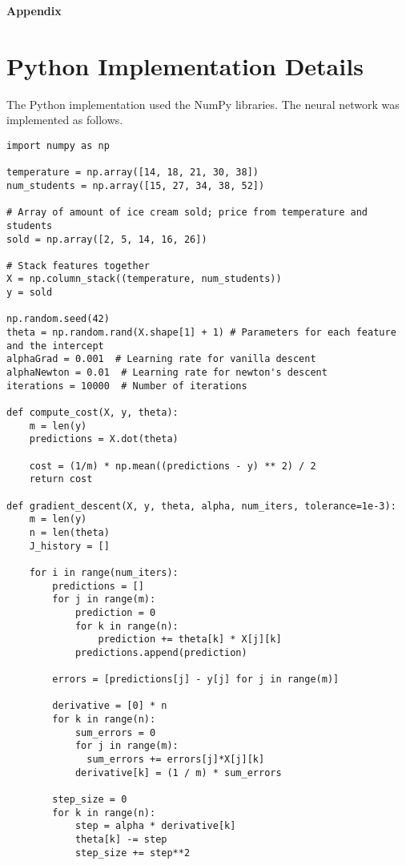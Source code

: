 \documentclass[12pt]{article}
\theoremstyle{definition}
\begin{document}
\newpage
\appendix

\begin{center}
    {\Huge \textbf{Appendix}}
\end{center}

\section{Python Implementation Details}
\label{sec:appendixA}
The Python implementation used the NumPy libraries. The neural network was implemented as follows.

\begin{lstlisting}
import numpy as np

temperature = np.array([14, 18, 21, 30, 38])
num_students = np.array([15, 27, 34, 38, 52])

# Array of amount of ice cream sold; price from temperature and students
sold = np.array([2, 5, 14, 16, 26])

# Stack features together
X = np.column_stack((temperature, num_students))
y = sold

np.random.seed(42)
theta = np.random.rand(X.shape[1] + 1) # Parameters for each feature and the intercept
alphaGrad = 0.001  # Learning rate for vanilla descent
alphaNewton = 0.01  # Learning rate for newton's descent
iterations = 10000  # Number of iterations

def compute_cost(X, y, theta):
    m = len(y)
    predictions = X.dot(theta)

    cost = (1/m) * np.mean((predictions - y) ** 2) / 2
    return cost

def gradient_descent(X, y, theta, alpha, num_iters, tolerance=1e-3):
    m = len(y) 
    n = len(theta)
    J_history = []

    for i in range(num_iters):
        predictions = []
        for j in range(m):
            prediction = 0
            for k in range(n):
                prediction += theta[k] * X[j][k]
            predictions.append(prediction)

        errors = [predictions[j] - y[j] for j in range(m)]

        derivative = [0] * n
        for k in range(n):
            sum_errors = 0
            for j in range(m):
              sum_errors += errors[j]*X[j][k]
            derivative[k] = (1 / m) * sum_errors

        step_size = 0
        for k in range(n):
            step = alpha * derivative[k]
            theta[k] -= step
            step_size += step**2


\end{lstlisting}
\end{document}
